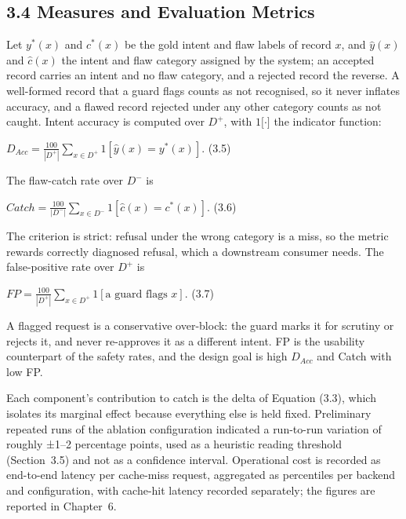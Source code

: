\documentclass[
]{article}
\begin{document}
\hypertarget{measures-and-evaluation-metrics}{%
\subsection{3.4 Measures and Evaluation
Metrics}\label{measures-and-evaluation-metrics}}

Let \(y^{\text{*}}(x)\) and \(c^{\text{*}}(x)\) be the gold intent and
flaw labels of record \(x\), and \(\widehat{y}(x)\) and
\(\widehat{c}(x)\) the intent and flaw category assigned by the system;
an accepted record carries an intent and no flaw category, and a
rejected record the reverse. A well-formed record that a guard flags
counts as not recognised, so it never inflates accuracy, and a flawed
record rejected under any other category counts as not caught. Intent
accuracy is computed over \(D^{\text{+}}\), with
\(1\lbrack \cdot \rbrack\) the indicator function:

\(D_{Acc} = \frac{100}{\left| D^{\text{+}} \right|}\sum_{x \in D^{\text{+}}}^{}1\left\lbrack \widehat{y}(x) = y^{\text{*}}(x) \right\rbrack.\)
(3.5)

The flaw-catch rate over \(D^{-}\) is

\(Catch = \frac{100}{\left| D^{-} \right|}\sum_{x \in D^{-}}^{}1\left\lbrack \widehat{c}(x) = c^{\text{*}}(x) \right\rbrack.\)
(3.6)

The criterion is strict: refusal under the wrong category is a miss, so
the metric rewards correctly diagnosed refusal, which a downstream
consumer needs. The false-positive rate over \(D^{\text{+}}\) is

\(FP = \frac{100}{\left| D^{\text{+}} \right|}\sum_{x \in D^{\text{+}}}^{}1\left\lbrack \text{a\ guard\ flags\ }x \right\rbrack.\)
(3.7)

A flagged request is a conservative over-block: the guard marks it for
scrutiny or rejects it, and never re-approves it as a different intent.
FP is the usability counterpart of the safety rates, and the design goal
is high \(D_{Acc}\) and Catch with low FP.

Each component's contribution to catch is the delta of Equation (3.3),
which isolates its marginal effect because everything else is held
fixed. Preliminary repeated runs of the ablation configuration indicated
a run-to-run variation of roughly ±1--2 percentage points, used as a
heuristic reading threshold (Section~3.5) and not as a confidence
interval. Operational cost is recorded as end-to-end latency per
cache-miss request, aggregated as percentiles per backend and
configuration, with cache-hit latency recorded separately; the figures
are reported in Chapter~6.
\end{document}
